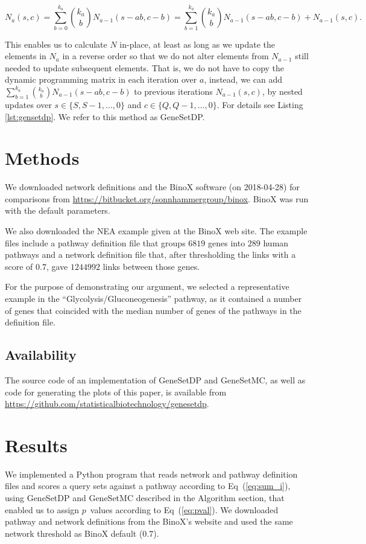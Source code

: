 \documentclass[10pt,letterpaper]{article}
\begin{document}
\[
N_a(s,c)=\sum_{b=0}^{k_a}{k_a \choose b} N_{a-1}(s-ab,c-b)=\sum_{b=1}^{k_a}{k_a \choose b} N_{a-1}(s-ab,c-b) + N_{a-1}(s,c).
\]


This enables us to calculate $N$ in-place, at least as long as we update the elements in $N_a$ in a reverse order so that we do not alter elements from $N_{a-1}$ still needed to update subsequent elements. That is, we do not have to copy the dynamic programming matrix in each iteration over $a$, instead, we can add $\sum_{b=1}^{k_a}{k_a \choose b} N_{a-1}(s-ab,c-b)$ to previous iterations $N_{a-1}(s,c)$, by nested updates over $s \in \{ S, S-1, \ldots, 0 \}$ and $c \in \{ Q, Q-1, \ldots, 0 \}$. For details see Listing \ref{lst:gensetdp}. We refer to this method as GeneSetDP.

\section*{Methods}

We downloaded network definitions and the BinoX software (on 2018-04-28) for comparisons from \url{https://bitbucket.org/sonnhammergroup/binox}. BinoX was run with the default parameters.

We also downloaded the NEA example given at the BinoX web site. The example files include a pathway definition file that groups $6819$ genes into $289$ human pathways and a network definition file that, after thresholding the links with a score of $0.7$, gave $1244992$ links between those genes.

For the purpose of demonstrating our argument, we selected a representative example in the ``Glycolysis/Gluconeogenesis'' pathway, as it contained a number of genes that coincided with the median number of genes of the pathways in the definition file.

\subsection*{Availability}

The source code of an implementation of GeneSetDP and GeneSetMC, as well as code for generating the plots of this paper, is available from \url{https://github.com/statisticalbiotechnology/genesetdp}.

\section*{Results}

We implemented a Python program that reads network and pathway definition files and scores a query sets against a pathway according to Eq~(\ref{eq:sum_i}), using GeneSetDP and GeneSetMC described in the Algorithm section, that enabled us to assign $p$~values according to Eq~(\ref{eq:pval}). We downloaded pathway and network definitions from the BinoX's website and used the same network threshold as BinoX default ($0.7$).
\end{document}
